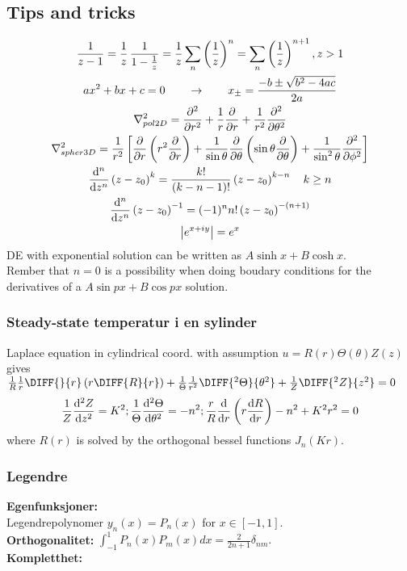 \documentclass[a4paper, 10pt]{article}
\begin{document}
\begin{multicols*}{3}
\begin{mdframed}
\subsection*{Tips and tricks}
\end{mdframed}
\begin{multline*}
  \frac{1}{z-1} = \frac{1}{z}\,\frac{1}{1-\frac{1}{z}} = \frac{1}{z}\sum_n\left(\frac{1}{z}\right)^n = \sum_n\left(\frac{1}{z}\right)^{n+1}, z>1 \\
  ax^2 + bx + c = 0 \qquad \rightarrow \qquad x_{\pm} = \frac{-b \pm \sqrt{b^2 - 4ac}}{2a} \\
  \nabla^2_{pol2D} = \pdv[2]{}{r} + \frac{1}{r}\pdv{}{r} + \frac{1}{r^2}\pdv[2]{}{\theta}\\
  \nabla^2_{spher3D} = \frac{1}{r^2}\left[ \pdv{}{r}\left( r^2\pdv{}{r} \right) + \frac{1}{\sin{\theta}}\pdv{}{\theta}\left( \sin{\theta}\pdv{}{\theta}\right) + \frac{1}{\sin^2{\theta}}\pdv[2]{}{\phi}\right]\\
  \dv[n]{}{z}\left(z-z_0\right)^{k} = \frac{k!}{(k-n-1)!}\left(z-z_0\right)^{k-n}\quad k\geq n\\
  \dv[n]{}{z}\left(z-z_0\right)^{-1} = (-1)^nn!\left(z-z_0\right)^{-(n+1)}\\
  \abs{e^{x+iy}} = e^x
\end{multline*}
DE with exponential solution can be written as $A\sinh{x} + B\cosh{x}$.\\
Rember that $n=0$ is a possibility when doing boudary conditions for the derivatives of a $A\sin{px} + B\cos{px}$ solution.
\subsubsection*{\small Steady-state temperatur i en sylinder}
Laplace equation in cylindrical coord. with assumption $u=R(r)\Theta(\theta)Z(z)$ gives
$\frac{1}{R}\frac{1}{r}\DIFF{}{r}\left(r\DIFF{R}{r}\right)+\frac{1}{\Theta}\frac{1}{r^2}\DIFF{^2\Theta}{\theta^2}+\frac{1}{Z}\DIFF{^2 Z}{z^2}=0$
$$
 \frac{1}{Z}\dv[2]{Z}{z}=K^2;
 \frac{1}{\Theta} \dv[2]{\Theta}{\theta}=-n^2;
 \frac{r}{R}\dv{}{r}\left(r\dv{R}{r}\right)-n^2+K^2 r^2=0
$$
where $R(r)$ is solved by the orthogonal bessel functions $J_n(Kr)$.

\subsubsection*{\small Legendre}
\textbf{Egenfunksjoner:} \\
Legendrepolynomer $y_n(x)=P_n(x)$ for $x\in[-1,1]$. \\
\textbf{Orthogonalitet: }
$  \int_{-1}^1 P_n(x)P_m(x)dx=\frac{2}{2n+1}\delta_{nm}.$ \\
\textbf{Kompletthet: }


\end{multicols*}
\end{document}
